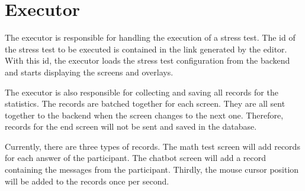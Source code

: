\section{Executor}
\label{sec:executor}

The executor is responsible for handling the execution of a stress test.
The id of the stress test to be executed is contained in the link generated by the editor.
With this id, the executor loads the stress test configuration from the backend and starts displaying the screens and overlays.

The executor is also responsible for collecting and saving all records for the statistics.
The records are batched together for each screen.
They are all sent together to the backend when the screen changes to the next one.
Therefore, records for the end screen will not be sent and saved in the database.

Currently, there are three types of records.
The math test screen will add records for each answer of the participant.
The chatbot screen will add a record containing the messages from the participant.
Thirdly, the mouse cursor position will be added to the records once per second.
